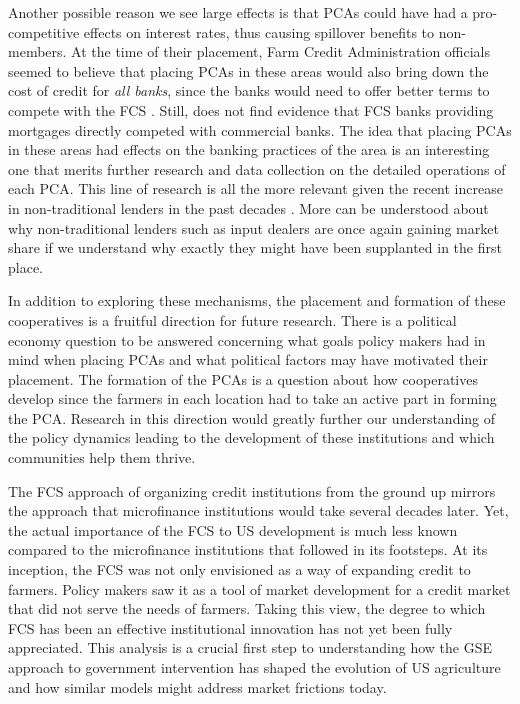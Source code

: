\documentclass[12pt]{article}
\begin{document}
Another possible reason we see large effects is that PCAs could have had a pro-competitive effects on interest rates, thus causing spillover benefits to non-members.
At the time of their placement, Farm Credit Administration officials seemed to believe that placing PCAs in these areas would also bring down the cost of credit for \textit{all banks}, since the banks would need to offer better terms to compete with the FCS \citep{Arnold1958}.
Still, \citet{alston_why_1994} does not find evidence that FCS banks providing mortgages directly competed with commercial banks.
The idea that placing PCAs in these areas had effects on the banking practices of the area is an interesting one that merits further research and data collection on the detailed operations of each PCA.
This line of research is all the more relevant given the recent increase in non-traditional lenders in the past decades \citep{fiechter_what_2020,brewer_farmers_2019,stevens2021nontraditional}.
More can be understood about why non-traditional lenders such as input dealers are once again gaining market share if we understand why exactly they might have been supplanted in the first place.

In addition to exploring these mechanisms, the placement and formation of these cooperatives is a fruitful direction for future research.
There is a political economy question to be answered concerning what goals policy makers had in mind when placing PCAs and what political factors may have motivated their placement.
The formation of the PCAs is a question about how cooperatives develop since the farmers in each location had to take an active part in forming the PCA.
Research in this direction would greatly further our understanding of the policy dynamics leading to the development of these institutions and which communities help them thrive.

The FCS approach of organizing credit institutions from the ground up mirrors the approach that microfinance institutions would take several decades later.
Yet, the actual importance of the FCS to US development is much less known compared to the microfinance institutions that followed in its footsteps.
At its inception, the FCS was not only envisioned as a way of expanding credit to farmers.
Policy makers saw it as a tool of market development for a credit market that did not serve the needs of farmers.
Taking this view, the degree to which FCS has been an effective institutional innovation has not yet been fully appreciated.
This analysis is a crucial first step to understanding how the GSE approach to government intervention has shaped the evolution of US agriculture and how similar models might address market frictions today.




\theendnotes
\end{document}
